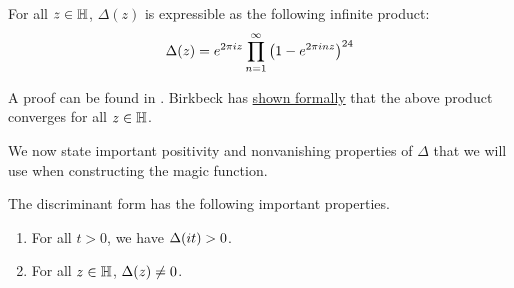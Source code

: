 \begin{boxtheorem}\label{Ch2:Thm:Delta_Product_Formula}
    For all $z \in \mathbb{H}$, $\Delta(z)$ is expressible as the following infinite product:
    \begin{align}
        \Delta(z) = e^{2 \pi i z} \prod_{n=1}^{\infty} \left( 1 - e^{2 \pi i n z} \right)^{24}
    \end{align}
\end{boxtheorem}


A proof can be found in \cite[Chapter VII, §4, Theorem 6, p. 95]{SerreArith}. Birkbeck has \href{https://github.com/thefundamentaltheor3m/Sphere-Packing-Lean/blob/ba092be9cdebb1a9c170a22c234e71ca1842a173/SpherePacking/ModularForms/multipliable_lems.lean#L107}{shown formally} that the above product converges for all $z \in \mathbb{H}$.



We now state important positivity and nonvanishing properties of $\Delta$ that we will use when constructing the magic function.

\begin{boxcorollary}
    The discriminant form has the following important properties.
    \begin{enumerate}
        \item For all $t > 0$, we have $\Delta\!\left( it \right) > 0$. %
        \item For all $z \in \mathbb{H}$, $\Delta\!\left( z \right) \neq 0$. %
    \end{enumerate}
\end{boxcorollary}

